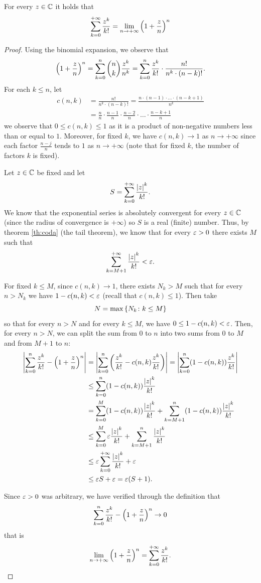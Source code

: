 \begin{theorem}%
\label{th:limite_notevole_esponenziale_complesso}%
\mymark{*}%
For every $z\in {\mathbb C}$ it holds that
\[
  \sum_{k=0}^{+\infty} \frac{z^k}{k!} = \lim_{n \to +\infty} {\left( 1+\frac z n \right)}^n  
\]
\end{theorem}
%
\begin{proof}
\mymark{*}
Using the binomial expansion, we observe that
\[
 {\left( 1+\frac z n \right)}^n
 = \sum_{k=0}^n \binom{n}{k} \frac{z^k}{n^k}
 = \sum_{k=0}^n \frac{z^k}{k!} \cdot \frac{n!}{n^k\cdot (n-k)!}.
\]
For each $k\le n$, let
\begin{align*}
 c(n,k)
  &= \frac{n!}{n^k\cdot (n-k)!}
  = \frac{n \cdot (n-1) \cdot \ldots \cdot(n-k+1)}{n^k} \\
    &= \frac{n}{n}\cdot {\frac {n-1} n} \cdot \frac {n-2} {n} \cdot \ldots \cdot
  \frac{n-k+1}{n}
\end{align*}
we observe that $0\le c(n,k)\le 1$ as it is
a product of non-negative numbers less than or equal to $1$.
Moreover, for fixed $k$, we have $c(n,k)  \to 1$ as $n\to +\infty$
since each factor $\frac{n-j}{n}$ tends
to $1$ as $n\to +\infty$ (note that for fixed $k$, the number of factors $k$ is
fixed).

Let $z\in {\mathbb C}$ be fixed and let
\[
  S = \sum_{k=0}^{+\infty} \frac{{\left|z\right|}^k}{k!}.
\]
We know that the exponential series is absolutely convergent
for every $z\in {\mathbb C}$ (since the radius of convergence is $+\infty$)
so $S$ is a real (finite) number.
Thus, by theorem \ref{th:coda} (the tail theorem), we know that for every
$\varepsilon>0$
there exists $M$ such that
\[
   \sum_{k=M+1}^{+\infty} \frac{{\left|z\right|}^k}{k!} < \varepsilon.
\]

For fixed $k\le M$, since $c(n,k)\to 1$,
there exists $N_k > M$ such that for every $n>N_k$
we have $1-c(n,k) < \varepsilon$
(recall that $c(n,k)\le 1$).
Then take
\[
  N=\max{\left\{ N_k\colon k\le M \right\}}
\]
so that for every $n>N$ and for every $k\le M$, we have $0 \le 1-c(n,k) < \varepsilon$.
Then, for every $n>N$, we can split the sum from $0$ to $n$ into two
sums from $0$ to $M$ and from $M+1$ to $n$:
\begin{align*}
{\left|\sum_{k=0}^n \frac{z^k}{k!} - {\left( 1+\frac z n \right)}^n\right|}
&= {\left|\sum_{k=0}^n {\left( \frac{z^k}{k!} - c(n,k)\frac{z^k}{k!} \right)}\right|}
= {\left|\sum_{k=0}^n  (1-c(n,k))\frac{z^k}{k!}\right|} \\
&\le \sum_{k=0}^n  (1-c(n,k))\frac{{\left|z\right|}^k}{k!} \\
  &= \sum_{k=0}^{M} (1-c(n,k)) \frac{{\left|z\right|}^k}{k!}
   + \sum_{k=M+1}^n (1-c(n,k)) \frac{{\left|z\right|}^k}{k!} \\
&\le \sum_{k=0}^{M} \varepsilon \frac{{\left|z\right|}^k}{k!}
   + \sum_{k=M+1}^n \frac{{\left|z\right|}^k}{k!} \\
&\le  \varepsilon \sum_{k=0}^{+\infty} \frac{{\left|z\right|}^k}{k!}
    + \varepsilon \\
&\le \varepsilon S + \varepsilon
= \varepsilon (S+1).
\end{align*}

Since $\varepsilon>0$ was arbitrary, we have verified
through the definition that
\[
\sum_{k=0}^n \frac{z^k}{k!} - {\left( 1+\frac z n \right)}^n \to 0
\]
that is
\[
\lim_{n\to +\infty} {\left( 1+\frac z n \right)}^n = \sum_{k=0}^{+\infty} \frac{z^k}{k!}.
\]
\end{proof}

